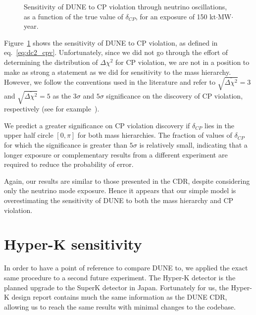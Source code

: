 \begin{figure}
	\centering
\caption{Sensitivity of DUNE to CP violation through neutrino oscillations, as
	a function of the true value of $\delta_{CP}$, for an exposure of 150
	kt$\cdot$MW$\cdot$year.}
\label{fig:sens_cp}
\end{figure}

Figure~\ref{fig:sens_cp} shows the sensitivity of DUNE to CP violation, as
defined in eq.~\ref{eq:dc2_cpv}. Unfortunately, since we did not go through the effort of
determining the distribution of $\Delta\chi^2$ for CP violation, we are not in
a position to make as strong a statement as we did for sensitivity to the mass hierarchy.
However, we follow the conventions used in the literature and refer to
$\sqrt{\overline{\Delta\chi^2}}=3$ and $\sqrt{\overline{\Delta\chi^2}}=5$ as
the $3\sigma$ and $5\sigma$ significance on the discovery of CP violation,
respectively (see for example~\cite{ballett, martin-albo, laguna-lbno, masud}). 

We predict a greater significance on CP violation discovery if $\delta_{CP}$
lies in the upper half circle $[0, \pi]$ for both mass hierarchies. The
fraction of values of $\delta_{CP}$ for which the significance is greater than
$5\sigma$ is relatively small, indicating that a longer exposure or
complementary results from a different experiment are required to reduce the
probability of error.

Again, our results are similar to those presented in the CDR, despite
considering only the neutrino mode exposure. Hence it appears that our simple
model is overestimating the sensitivity of DUNE to both the mass hierarchy and
CP violation.


\section{Hyper-K sensitivity}\label{sec:hyperk}
In order to have a point of reference to compare DUNE to, we applied the
exact same procedure to a second future experiment. The Hyper-K detector
is the planned upgrade to the SuperK detector in Japan. Fortunately for us, the
Hyper-K design report\cite{hyperk} contains much the same information as the
DUNE CDR, allowing us to reach the same results with minimal changes to
the codebase. 

